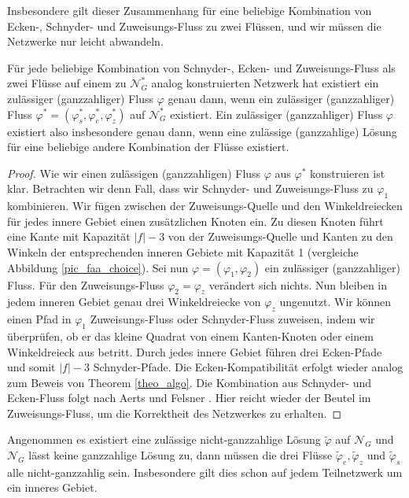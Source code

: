 Insbesondere gilt dieser Zusammenhang für eine beliebige Kombination von Ecken-, Schnyder- und Zuweisungs-Fluss zu zwei Flüssen, und wir müssen die Netzwerke nur leicht abwandeln.

\begin{proposition}\label{choose_types}
Für jede beliebige Kombination von Schnyder-, Ecken- und Zu\-weis\-ungs-Fluss als zwei Flüsse auf einem zu $\mathcal{N}^*_G$ analog konstruierten Netzwerk hat existiert ein zulässiger (ganzzahliger) Fluss $\varphi$ genau dann, wenn ein zulässiger (ganzzahliger) Fluss $\varphi^*=(\varphi^*_s,\varphi^*_e,\varphi^*_z)$ auf $\mathcal{N}^*_G$ existiert. Ein zulässiger (ganzzahliger) Fluss $\varphi$ existiert also insbesondere genau dann, wenn eine zulässige (ganzzahlige) Lösung für eine beliebige andere Kombination der Flüsse existiert.
\end{proposition}

\begin{proof}
Wie wir einen zulässigen (ganzzahligen) Fluss $\varphi$ aus $\varphi^*$ konstruieren ist klar. Betrachten wir denn Fall, dass wir Schnyder- und Zu\-weis\-ungs-Fluss zu $\varphi_1$ kombinieren. Wir fügen zwischen der Zuweisungs-Quelle und den Winkeldreiecken für jedes innere Gebiet einen zusätzlichen Knoten ein. Zu diesen Knoten führt eine Kante mit Kapazität $|f|-3$ von der Zuweisungs-Quelle und Kanten zu den Winkeln der entsprechenden inneren Gebiete mit Kapazität 1 (vergleiche Abbildung \ref{pic_faa_choice}). Sei nun $\varphi=(\varphi_1,\varphi_2)$ ein zulässiger (ganzzahliger) Fluss. Für den Zuweisungs-Fluss $\varphi_2=\varphi_z$ verändert sich nichts. Nun bleiben in jedem inneren Gebiet genau drei Winkeldreiecke von $\varphi_z$ ungenutzt. Wir können einen Pfad in $\varphi_1$ Zuweisungs-Fluss oder Schnyder-Fluss zuweisen, indem wir überprüfen, ob er das kleine Quadrat von einem Kanten-Knoten oder einem Winkeldreieck aus betritt. Durch jedes innere Gebiet führen drei Ecken-Pfade und somit $|f|-3$ Schnyder-Pfade. Die Ecken-Kompatibilität erfolgt wieder analog zum Beweis von Theorem \ref{theo_algo}. Die Kombination aus Schnyder- und Ecken-Fluss folgt nach Aerts und Felsner \cite{af15}. Hier reicht wieder der Beutel im Zuweisungs-Fluss, um die Korrektheit des Netzwerkes zu erhalten.
\end{proof}

\begin{claim}\label{claim_non_int}
Angenommen es existiert eine zulässige nicht-ganzzahlige Lösung $\tilde{\varphi}$ auf $\mathcal{N}_G$ und $\mathcal{N}_G$ lässt keine ganzzahlige Lösung zu, dann müssen die drei Flüsse $\tilde{\varphi}_e, \tilde{\varphi}_z$ und $\tilde{\varphi}_s$ alle nicht-ganzzahlig sein. Insbesondere gilt dies schon auf jedem Teilnetzwerk um ein inneres Gebiet.
\end{claim}

